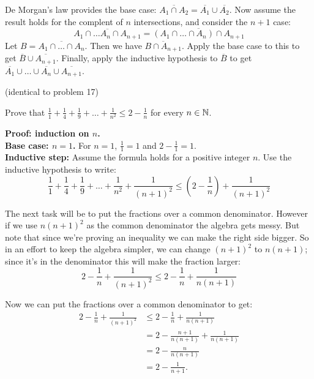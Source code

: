 \documentclass{article}
\begin{document}
De Morgan's law provides the base case: $\overline{A_1 \cap A_2} = \overline{A_1} \cup \overline{A_2}$. Now assume the result holds for the complent of $n$ intersections, and consider the $n+1$ case:
$$\overline{A_1 \cap \ldots A_n \cap A_{n+1}} = \overline{(A_1 \cap \ldots \cap A_n) \cap A_{n+1}}$$
Let $B = \overline{A_1 \cap \ldots \cap A_n}$. Then we have $\overline{B \cap A_{n+1}}$. Apply the base case to this to get $\overline{B} \cup \overline{A_{n+1}}$. Finally, apply the inductive hypothesis to $\overline{B}$ to get $\overline{A_1} \cup \ldots \cup \overline{A_n} \cup \overline{A_{n+1}}$.

\begin{problem}
(identical to problem 17)
\end{problem}

\begin{problem}
Prove that $\frac{1}{1} + \frac{1}{4} + \frac{1}{9} + \ldots + \frac{1}{n^2} \leq 2 - \frac{1}{n}$ for every $n \in \mathbb{N}$.
\end{problem}

\textbf{Proof: induction on $n$.}
\\

\textbf{Base case: $n = 1$.} For $n = 1$, $\frac{1}{1} = 1$ and $2 - \frac{1}{1} = 1$.
\\

\textbf{Inductive step:} Assume the formula holds for a positive integer $n$. Use the inductive hypothesis to write:
$$\frac{1}{1} + \frac{1}{4} + \frac{1}{9} + \ldots + \frac{1}{n^2} + \frac{1}{(n+1)^2} \leq \left(2 - \frac{1}{n}\right) + \frac{1}{(n+1)^2}$$

The next task will be to put the fractions over a common denominator. However if we use $n(n+1)^2$ as the common denominator the algebra gets messy. But note that since we're proving an inequality we can make the right side bigger. So in an effort to keep the algebra simpler, we can change $(n+1)^2$ to $n(n+1)$; since it's in the denominator this will make the fraction larger:
$$2 - \frac{1}{n} + \frac{1}{(n+1)^2} \leq 2 - \frac{1}{n} + \frac{1}{n(n+1)}$$

Now we can put the fractions over a common denominator to get:
\begin{align*}
  2 - \frac{1}{n} + \frac{1}{(n+1)^2} & \leq 2 - \frac{1}{n} + \frac{1}{n(n+1)}     \\
                                      & = 2 - \frac{n+1}{n(n+1)} + \frac{1}{n(n+1)} \\
                                      & = 2 - \frac{n}{n(n+1)}                      \\
                                      & = 2 - \frac{1}{n+1}.
\end{align*}
\end{document}
